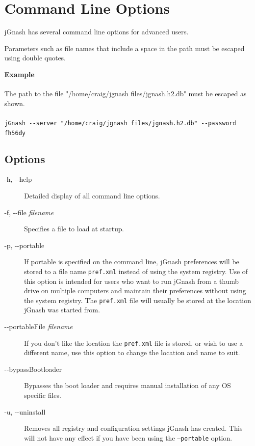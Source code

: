 \documentclass[letterpaper,12pt]{book}
\begin{document}
    \chapter{Command Line Options}
    \label{ch:cmdoptions}

    jGnash has several command line options for advanced users.

    Parameters such as file names that include a space in the path must be escaped using double quotes.

    \begin{mdframed}[style=info]
        \textbf{Example} \\ \\
        The path to the file "/home/craig/jgnash files/jgnash.h2.db" must be escaped as shown.
        \\ \\
        \texttt{jGnash -{}-server "/home/craig/jgnash files/jgnash.h2.db" -{}-password fh56dy}
    \end{mdframed}

    \section{Options}
    \begin{description}
        \item[-h, -{}-help]
        Detailed display of all command line options.
        \item[-f, -{}-file \textit{filename}]
        Specifies a file to load at startup.
        \item[-p, -{}-portable]
        If portable is specified on the command line, jGnash preferences will be stored to a file name \texttt{pref.xml}
        instead of using the system registry.
        Use of this option is intended for users who want to run jGnash from a thumb drive on multiple computers and
        maintain their preferences without using the system registry.
        The \texttt{pref.xml} file will usually be stored at the location jGnash was started from.
        \item[-{}-portableFile \textit{filename}]
        If you don't like the location the \texttt{pref.xml} file is stored, or wish to use a different name, use
        this option to change the location and name to suit.
        \item[-{}-bypassBootloader]
        Bypasses the boot loader and requires manual installation of any OS specific files.
        \item[-u, -{}-uninstall]
        Removes all registry and configuration settings jGnash has created.
        This will not have any effect if you have been using the \texttt{--portable} option.
    \end{description}
\end{document}
